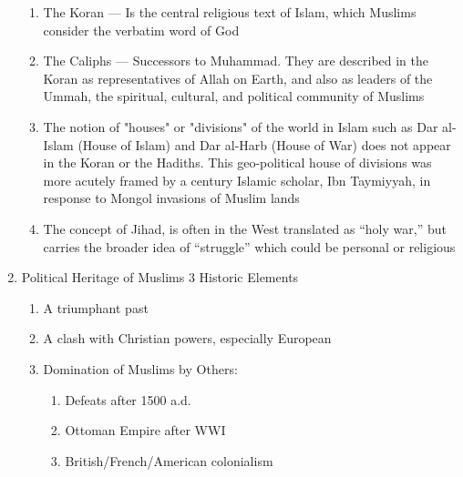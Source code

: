 \documentclass[12pt]{article}
\begin{document}
\begin{enumerate}
\begin{enumerate}
          \item The Koran — Is the central religious text of Islam, which Muslims consider the verbatim word of God

          \item The Caliphs — Successors to Muhammad. They are described in the Koran as representatives of Allah on Earth, and also as leaders of the Ummah, the spiritual, cultural, and political community of Muslims

          \item The notion of "houses" or "divisions" of the world in Islam such as Dar al-Islam (House of Islam) and Dar al-Harb (House of War) does not appear in the Koran or the Hadiths. This geo-political house of divisions was more acutely framed by a  century Islamic scholar, Ibn Taymiyyah, in response to Mongol invasions of Muslim lands

          \item The concept of Jihad, is often in the West translated as “holy war,” but carries the broader idea of “struggle” which could be personal or religious

        \end{enumerate}

      \item Political Heritage of Muslims 3 Historic Elements

        \begin{enumerate}

          \item A triumphant past

          \item A clash with Christian powers, especially European

          \item Domination of Muslims by Others:

            \begin{enumerate}

              \item Defeats after 1500 a.d.

              \item Ottoman Empire after WWI

              \item British/French/American colonialism

            \end{enumerate}

        \end{enumerate}


\end{enumerate}
\end{document}

